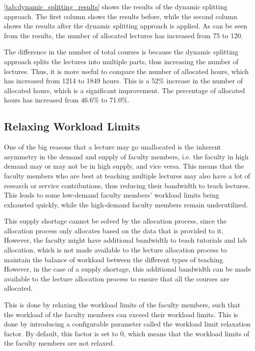 \autoref{tab:dynamic_splitting_results} shows the results of the dynamic splitting approach. The first column shows the results before, while the second column shows the results after the dynamic splitting approach is applied. As can be seen from the results, the number of allocated lectures has increased from 75 to 120.

The difference in the number of total courses is because the dynamic splitting approach splits the lectures into multiple parts, thus increasing the number of lectures. Thus, it is more useful to compare the number of allocated hours, which has increased from 1214 to 1849 hours. This is a 52\% increase in the number of allocated hours, which is a significant improvement. The percentage of allocated hours has increased from 46.6\% to 71.0\%.


\subsection{Relaxing Workload Limits}
\label{sec:workload_limit_relaxation}

One of the big reasons that a lecture may go unallocated is the inherent asymmetry in the demand and supply of faculty members, i.e. the faculty in high demand may or may not be in high supply, and vice versa. This means that the faculty members who are best at teaching multiple lectures may also have a lot of research or service contributions, thus reducing their bandwidth to teach lectures. This leads to some low-demand faculty members' workload limits being exhausted quickly, while the high-demand faculty members remain underutilized.

This supply shortage cannot be solved by the allocation process, since the allocation process only allocates based on the data that is provided to it. However, the faculty might have additional bandwidth to teach tutorials and lab allocation, which is not made available to the lecture allocation process to maintain the balance of workload between the different types of teaching. However, in the case of a supply shortage, this additional bandwidth can be made available to the lecture allocation process to ensure that all the courses are allocated.

This is done by relaxing the workload limits of the faculty members, such that the workload of the faculty members can exceed their workload limits. This is done by introducing a configurable parameter called the workload limit relaxation factor. By default, this factor is set to 0, which means that the workload limits of the faculty members are not relaxed.

